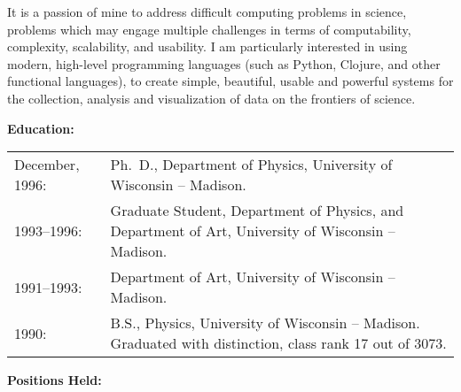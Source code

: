 It is a passion of mine to address difficult computing problems in science, problems which may engage multiple challenges in terms of computability, complexity, scalability, and usability.  I am particularly interested in using modern, high-level programming languages (such as Python, Clojure, and other functional languages), to create simple, beautiful, usable and powerful systems for the collection, analysis and visualization of data on the frontiers of science.

\vspace{0.5cm}

{\bf Education:}
\vspace{0.25cm}

\begin{tabular}[t]{lp{}}

December, 1996: & Ph.~D., Department of Physics,
University of Wisconsin -- Madison.
\\[0.25cm]

1993--1996: & Graduate Student, Department of Physics, and Department of Art,
University of Wisconsin -- Madison.\\[0.25cm]

1991--1993: & Department of Art, University of Wisconsin -- Madison.
\\[0.25cm]

1990: & B.S., Physics, University of Wisconsin -- Madison.  Graduated
with distinction, class rank 17 out of 3073.

\end{tabular}

\newpage
\pagestyle{myheadings}

{\bf Positions Held:}
\vspace{0.25cm}


